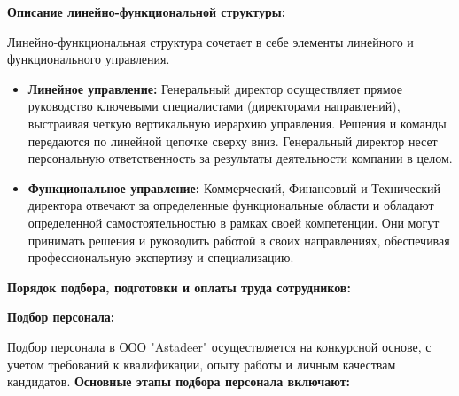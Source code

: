 \vspace{0.3cm}

\textbf{Описание линейно-функциональной структуры:}

Линейно-функциональная структура сочетает в себе элементы линейного и функционального управления.

\begin{itemize}
    \item \textbf{Линейное управление:}  Генеральный директор осуществляет прямое руководство ключевыми специалистами (директорами направлений), выстраивая четкую вертикальную иерархию управления.  Решения и команды передаются по линейной цепочке сверху вниз.  Генеральный директор несет персональную ответственность за результаты деятельности компании в целом.
    \item \textbf{Функциональное управление:}  Коммерческий, Финансовый и Технический директора отвечают за определенные функциональные области и обладают определенной самостоятельностью в рамках своей компетенции.  Они могут принимать решения и руководить работой в своих направлениях, обеспечивая профессиональную экспертизу и специализацию.
\end{itemize}

\vspace{0.3cm}

\textbf{Порядок подбора, подготовки и оплаты труда сотрудников:}

\textbf{Подбор персонала:}

Подбор персонала в ООО "Astadeer" осуществляется на конкурсной основе, с учетом требований к квалификации, опыту работы и личным качествам кандидатов.  \textbf{Основные этапы подбора персонала включают:}

